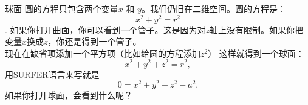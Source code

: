 ﻿\begin{surferPage}{球面}
圆的方程只包含两个变量$x$ 和 $y$。我们仍旧在二维空间。圆的方程是：
\[x^2+y^2=r^2\].
如果你打开曲面，你可以看到一个管子。这是因为对$z$轴上没有限制。如果你把变量$x$换成$z$，你还是得到一个管子。\\
现在在缺省项添加一个平方项（比如给圆的方程添加$z^2$）
这样就得到一个球面：
\[x^2+y^2+z^2=r^2,\]
用SURFER语言来写就是
\[0=x^2+y^2+z^2-a^2.\]
如果你打开球面，会看到什么呢？
\end{surferPage}
